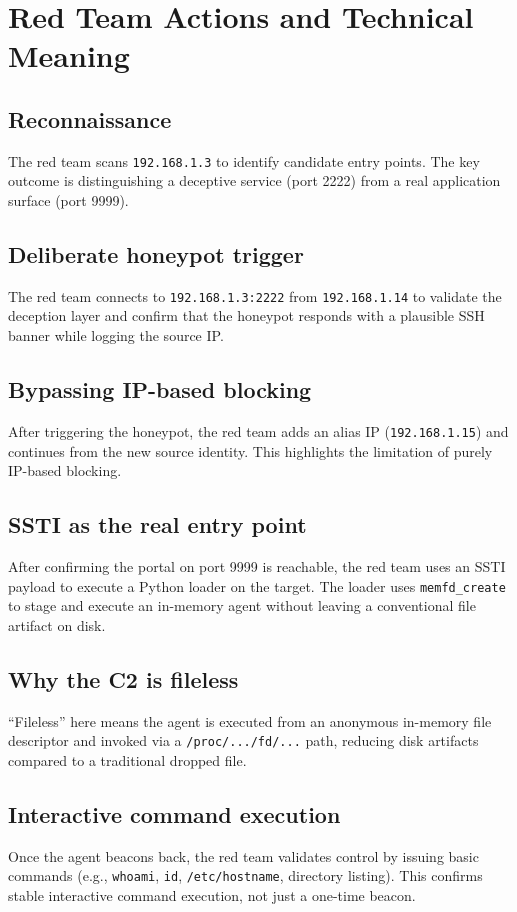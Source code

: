 \documentclass[11pt]{article}
\begin{document}
\section{Red Team Actions and Technical Meaning}

\subsection{Reconnaissance}
The red team scans \texttt{192.168.1.3} to identify candidate entry points. The key outcome is distinguishing a deceptive service (port 2222) from a real application surface (port 9999).

\subsection{Deliberate honeypot trigger}
The red team connects to \texttt{192.168.1.3:2222} from \texttt{192.168.1.14} to validate the deception layer and confirm that the honeypot responds with a plausible SSH banner while logging the source IP.

\subsection{Bypassing IP-based blocking}
After triggering the honeypot, the red team adds an alias IP (\texttt{192.168.1.15}) and continues from the new source identity. This highlights the limitation of purely IP-based blocking.

\subsection{SSTI as the real entry point}
After confirming the portal on port 9999 is reachable, the red team uses an SSTI payload to execute a Python loader on the target. The loader uses \texttt{memfd\_create} to stage and execute an in-memory agent without leaving a conventional file artifact on disk.

\subsection{Why the C2 is fileless}
``Fileless'' here means the agent is executed from an anonymous in-memory file descriptor and invoked via a \texttt{/proc/.../fd/...} path, reducing disk artifacts compared to a traditional dropped file.

\subsection{Interactive command execution}
Once the agent beacons back, the red team validates control by issuing basic commands (e.g., \texttt{whoami}, \texttt{id}, \texttt{/etc/hostname}, directory listing). This confirms stable interactive command execution, not just a one-time beacon.
\end{document}
